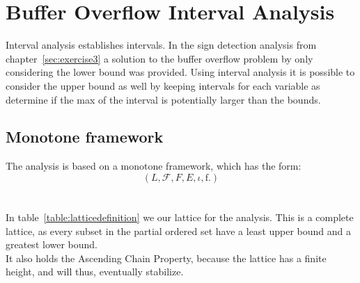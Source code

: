 {\setlength{\chapterfontsize}{24pt}
\chapter{Buffer Overflow Interval Analysis}
}
Interval analysis establishes intervals. In the sign detection analysis from chapter~\ref{sec:exercise3} a solution to the buffer overflow problem by only considering the lower bound was provided. Using interval analysis it is possible to consider the upper bound as well by keeping intervals for each variable as determine if the max of the interval is potentially larger than the bounds.

\section{Monotone framework}
The analysis is based on a monotone framework, which has the form:
\begin{equation}
  \left(L, \mathcal{F}, F, E, \iota, \mathrm{f}.  \right)
  \label{eq:monotone_framework}
\end{equation}
\\\\
In table~\ref{table:latticedefinition} we our lattice for the analysis. This is a complete lattice, as every subset in the partial ordered set have a least upper bound and a greatest lower bound.\\
It also holds the Ascending Chain Property, because the lattice has a finite height, and will thus, eventually stabilize.
